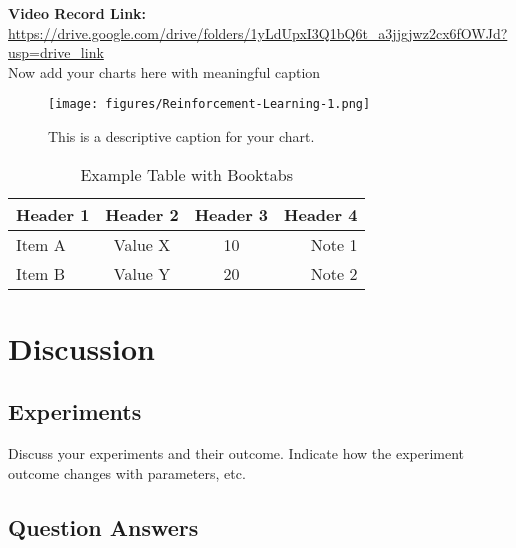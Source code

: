 \documentclass[a4paper,11pt,oneside]{book}
\begin{document}
    \noindent\textbf{Video Record Link:} \\
    \url{https://drive.google.com/drive/folders/1yLdUpxI3Q1bQ6t_a3jjgjwz2cx6fOWJd?usp=drive_link} \\[1cm]

Now add your charts here with meaningful caption 

\begin{figure}[h!] %
    \centering %
    \texttt{[image: figures/Reinforcement-Learning-1.png]} %
    \caption{This is a descriptive caption for your chart.} %
    \label{fig:mychart} %
\end{figure}

\begin{table}[h]
\centering
\caption{Example Table with Booktabs}
\label{tab:booktabs_example}
\begin{tabular}{lccr}
\toprule
\textbf{Header 1} & \textbf{Header 2} & \textbf{Header 3} & \textbf{Header 4} \\
\midrule
Item A & Value X & 10 & Note 1 \\
Item B & Value Y & 20 & Note 2 \\
\bottomrule
\end{tabular}
\end{table}

\chapter*{Discussion}

\section{Experiments}
Discuss your experiments and their outcome.
Indicate how the experiment outcome changes with parameters, etc.

\section{Question Answers}
\end{document}
